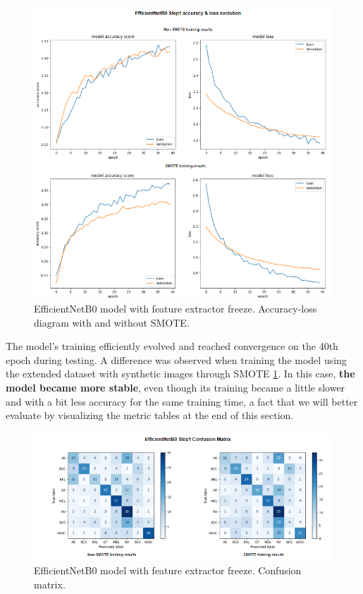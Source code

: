 \begin{figure}[ht]
    \begin{center}
        \includegraphics[scale=0.60]{images/Building/Model Efficientnet/modelENetB0_1_model accuray-loss.png}
        \caption{EfficientNetB0 model with feature extractor freeze. Accuracy-loss diagram with and without SMOTE.}
    \label{fig: Model_ENet_1_accuracy_loss}    
    \end{center}
\end{figure}

The model's training efficiently evolved and reached convergence on the 40th epoch during testing. A difference was observed when training the model using the extended dataset with synthetic images through SMOTE \ref{fig: Model_ENet_1_accuracy_loss}. In this case, \textbf{the model became more stable}, even though its training became a little slower and with a bit less accuracy for the same training time, a fact that we will better evaluate by visualizing the metric tables at the end of this section.


\begin{figure}[ht]
    \begin{center}
        \includegraphics[scale=0.85]{images/Building/Model Efficientnet/model_ENetB0_1 Confmat.png}
        \caption{EfficientNetB0 model with feature extractor freeze. Confusion matrix.}
    \label{fig: Model_ENet_1_confmat}    
    \end{center}
\end{figure}

